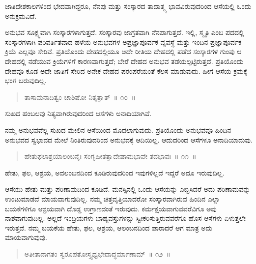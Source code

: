 ಜಾತಿದೇಶಕಾಲಗಳಿಂದ ಭೇದವಾಗಿದ್ದರೂ, ನೆನಪು ಮತ್ತು ಸಂಸ್ಕಾರದ ತಾದಾತ್ಮ್ಯ ಭಾವವಿರುವುದರಿಂದ ಆಸೆಯಲ್ಲಿ ಒಂದು ಅನುಕ್ರಮವಿದೆ. 

ಅನುಭವ ಸೂಕ್ಷ್ಮವಾಗಿ ಸಂಸ್ಕಾರಗಳಾಗುತ್ತದೆ. ಸಂಸ್ಕಾರವು ಜಾಗ್ರತವಾಗಿ ನೆನಪಾಗುತ್ತದೆ. ಇಲ್ಲಿ, ಸ್ಮೃತಿ ಎಂಬ ಪದದಲ್ಲಿ ಸಂಸ್ಕಾರಗಳಾಗಿ ಪರಿವರ್ತಿತವಾದ ಹಳೆಯ ಅನುಭವಗಳ ಅಪ್ರಜ್ಞಾಪೂರ್ವಕ ವ್ಯವಸ್ಥೆ ಮತ್ತು ಇಂದಿನ ಪ್ರಜ್ಞಾಪೂರ್ವಕ ಕ್ರಿಯೆ ಎಲ್ಲವೂ ಸೇರಿವೆ. ಪ್ರತಿಯೊಂದು ದೇಹದಲ್ಲಿಯೂ ಅದೇ ರೀತಿಯ ದೇಹದಲ್ಲಿ ಪಡೆದ ಸಂಸ್ಕಾರಗಳ ಗುಂಪು ಆ ದೇಹದಲ್ಲಿ ನಡೆಯುವ ಕ್ರಿಯೆಗಳಿಗೆ ಕಾರಣವಾಗುತ್ತದೆ; ಬೇರೆ ದೇಹದ ಅನುಭವ ತಡೆಯಲ್ಪಟ್ಟಿರುತ್ತದೆ. ಪ್ರತಿಯೊಂದು ದೇಹವೂ ಕೂಡ ಅದೇ ಜಾತಿಗೆ ಸೇರಿದ ಅನೇಕ ದೇಹದ ಪರಂಪರೆಯಂತೆ ಕೆಲಸ ಮಾಡುವುದು. ಹೀಗೆ ಆಸೆಯ ಕ್ರಮಕ್ಕೆ ಭಂಗ ಬರುವುದಿಲ್ಲ. 

\vspace{-0.3cm}

\begin{verse}
ತಾಸಾಮನಾದಿತ್ವಂ ಚಾಶಿಷೋ ನಿತ್ಯತ್ವಾತ್​~॥ ೧೦~॥
\end{verse}

\vspace{-0.3cm}

ಸುಖದ ಹಂಬಲವು ನಿತ್ಯವಾಗಿರುವುದರಿಂದ ಆಸೆಗಳು ಅನಾದಿಯಾಗಿವೆ. 

ನಮ್ಮ ಅನುಭವವೆಲ್ಲ ಸುಖದ ಮೇಲಿನ ಆಸೆಯಿಂದ ಮೊದಲಾಗುವುದು. ಪ್ರತಿಯೊಂದು ಅನುಭವವೂ ಹಿಂದಿನ ಅನುಭವದ ಸ್ವಭಾವದ ಮೇಲೆ ನಿಂತಿರುವುದರಿಂದ ಅನುಭವಕ್ಕೆ ಆದಿಯಿಲ್ಲ. ಆದುದರಿಂದ ಆಸೆಗಳೂ ಅನಾದಿಯಾದುವು. 

\vspace{-0.3cm}

\begin{verse}
ಹೇತುಫಲಾಶ್ರಯಾಲಂಬನೈಃ ಸಂಗೃಹೀತತ್ವಾದೇಷಾಮಭಾವೇ ತದಭಾವಃ~॥ ೧೧~॥
\end{verse}

\vspace{-0.3cm}

ಹೇತು, ಫಲ, ಆಶ್ರಯ, ಅವಲಂಬನದಿಂದ ಕೂಡಿರುವುದರಿಂದ ಇವುಗಳಿಲ್ಲದೆ ಇದ್ದರೆ ಅದೂ ಇರುವುದಿಲ್ಲ. 

ಆಸೆಯು ಹೇತು ಮತ್ತು ಪರಿಣಾಮದಿಂದ ಕೂಡಿದೆ. ಮನಸ್ಸಿನಲ್ಲಿ ಒಂದು ಆಸೆಯನ್ನು ಎಬ್ಬಿಸಿದರೆ ಅದು ಪರಿಣಾಮವನ್ನು ಉಂಟುಮಾಡದೆ ಮಾಯವಾಗುವುದಿಲ್ಲ. ನಮ್ಮ ಚಿತ್ತವೃತ್ತಿಯಾದರೋ ಸಂಸ್ಕಾರವಾಗಿರುವ ಹಿಂದಿನ ಎಲ್ಲಾ ಬಯಕೆಗಳಿಗೂ ಆಶ್ರಯವಾಗಿ ದೊಡ್ಡ ಉಗ್ರಾಣದಂತೆ ಇರುವುದು. ಕರ್ಮಕ್ಷಯವಾಗುವವರೆವಿಗೂ ಅವು ನಾಶವಾಗುವುದಿಲ್ಲ. ಅಲ್ಲದೆ ಇಂದ್ರಿಯಗಳು ಬಾಹ್ಯವಸ್ತುಗಳನ್ನು ಸ್ವೀಕರಿಸುತ್ತಿರುವವರೆಗೂ ಹೊಸ ಆಸೆಗಳು ಏಳುತ್ತಲೇ ಇರುತ್ತವೆ. ನಮ್ಮ ಬಯಕೆಯ ಹೇತು, ಫಲ, ಆಶ್ರಯ, ಆಲಂಬನದಿಂದ ಪಾರಾದರೆ ಆಗ ಮಾತ್ರ ಅದು ಮಾಯವಾಗುವುವು. 

\vspace{-0.3cm}

\begin{verse}
ಅತೀತಾನಾಗತಂ ಸ್ವರೂಪತೋಸ್ತ್ಯಧ್ವಭೇದಾದ್ಧರ್ಮಾಣಾಮ್​~॥ ೧೨~॥
\end{verse}

\vspace{-0.3cm}


